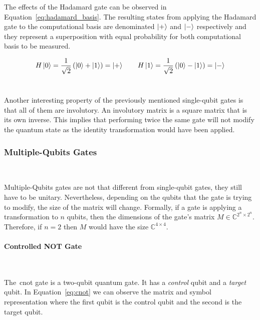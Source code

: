 The effects of the Hadamard gate can be observed in
Equation~\ref{eq:hadamard_basis}. The resulting states from applying
the Hadamard gate to the computational basis are denominated
\(\ket{+}\) and \(\ket{-}\) respectively and they represent
a superposition with equal probability for both computational 
basis to be measured. \

\begin{equation}\label{eq:hadamard_basis}
  H\ket{0} = \frac{1}{\sqrt{2}} \left( \ket{0} + \ket{1} \right) = \ket{+} \qquad
  H\ket{1} = \frac{1}{\sqrt{2}} \left( \ket{0} - \ket{1} \right) = \ket{-}
\end{equation} \

Another interesting property of the previously mentioned single-qubit
gates is that all of them are involutory. An involutory matrix is a
square matrix that is its own inverse. This implies that performing
twice the same gate will not modify the quantum state as the identity
transformation would have been applied. \


\subsubsection{Multiple-Qubits Gates}\label{subsubsection:multiple_qubit} \

Multiple-Qubits gates are not that different from single-qubit gates,
they still have to be unitary. Nevertheless, depending on the qubits
that the gate is trying to modify, the size of the matrix will change.
Formally, if a gate is applying a transformation to \(n\) qubits, then
the dimensions of the gate's matrix \(M \in \mathbb{C}^{2^n \times 2^n}\).
Therefore, if \(n = 2\) then \(M\) would have the size
\(\mathbb{C}^{4 \times 4}\). \

\paragraph{Controlled NOT Gate} \

The~\ac{cnot} gate is a two-qubit quantum gate. It has a
\textit{control} qubit and a \textit{target} qubit. In
Equation~\ref{eq:cnot} we can observe the matrix and
symbol representation where the first qubit is the control
qubit and the second is the target qubit. \

